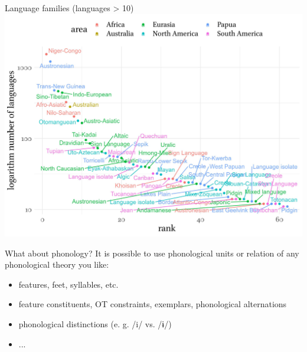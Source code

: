 \documentclass[13pt, t]{beamer}
\begin{document}
\begin{frame}{Language families (languages > 10)}
\includegraphics[width=\linewidth]{images/05_families_by_area.jpeg}
\end{frame}

\begin{frame}{What about phonology?}
It is possible to use phonological units or relation of any phonological theory you like:
\begin{itemize}
\item features, feet, syllables, etc.
\item feature constituents, OT constraints, exemplars, phonological alternations
\item phonological distinctions (e. g. /i/ vs. /ɨ/)
\item ...
\end{itemize}
\end{frame}

\end{document}
